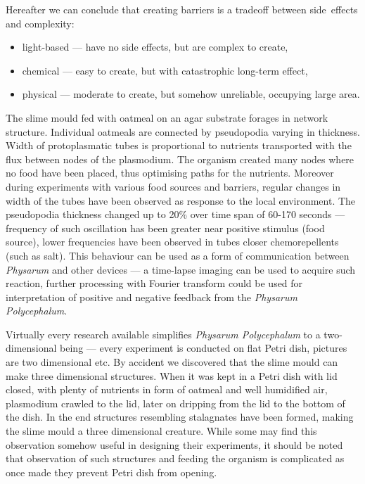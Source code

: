 Hereafter we can conclude that creating barriers is a tradeoff between side~effects and complexity:
\begin{itemize}
  \item light-based --- have no side effects, but are complex to create,
  \item chemical --- easy to create, but with catastrophic long-term effect,
  \item physical --- moderate to create, but somehow unreliable, occupying large area.
\end{itemize}

The slime mould fed with oatmeal on an agar substrate forages in network structure. Individual oatmeals are connected by pseudopodia varying in thickness. Width of protoplasmatic tubes is proportional to nutrients transported with the flux between nodes of the plasmodium. The organism created many nodes where no food have been placed, thus optimising paths for the nutrients. Moreover during experiments with various food sources and barriers, regular changes in width of the tubes have been observed as response to the local environment. The pseudopodia thickness changed up to 20\% over time span of 60-170 seconds --- frequency of such oscillation has been greater near positive stimulus (food source), lower frequencies have been observed in tubes closer chemorepellents (such as salt). This behaviour can be used as a form of communication between \textit{Physarum} and other devices --- a time-lapse imaging can be used to acquire such reaction, further processing with Fourier transform \cite{bracewell1965fourier} could be used for interpretation of positive and negative feedback from the \textit{Physarum Polycephalum}.

Virtually every research available simplifies \textit{Physarum Polycephalum} to a two-dimensional being --- every experiment is conducted on flat Petri dish, pictures are two dimensional etc. By accident we discovered that the slime mould can make three dimensional structures. When it was kept in a Petri dish with lid closed, with plenty of nutrients in form of oatmeal and well humidified air, plasmodium crawled to the lid, later on dripping from the lid to the bottom of the dish. In the end structures resembling stalagnates have been formed, making the slime mould a three dimensional creature. While some may find this observation somehow useful in designing their experiments, it should be noted that observation of such structures and feeding the organism is complicated as once made they prevent Petri dish from opening. 

